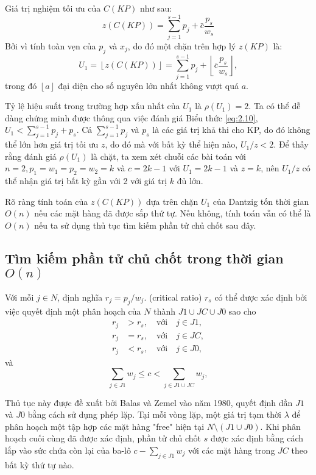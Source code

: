 Giá trị nghiệm tối ưu của $C(KP)$ như sau:
\begin{equation}
    z(C(KP)) = \sum_{j=1}^{s - 1}p_j + \bar{c}\frac{p_s}{w_s}
\end{equation}
Bởi vì tính toàn vẹn của $p_j$ và $x_j$, do đó một chặn trên hợp lý $z(KP)$ là:
\begin{equation}
    \label{eq:2.10}
    U_1 = \left \lfloor z(C(KP))\right \rfloor = \sum_{j = 1}^{s - 1}p_j + \left \lfloor \bar{c}\frac{p_s}{w_s}\right \rfloor,
\end{equation}
trong đó $\left \lfloor a\right \rfloor$ đại diện cho số nguyên lớn nhất không vượt quá $a$.

Tỷ lệ hiệu suất trong trường hợp xấu nhất của $U_1$ là $\rho(U_1) = 2$. Ta có thể dễ dàng chứng minh được thông qua việc đánh giá Biểu thức \eqref{eq:2.10}, $U_1 < \sum_{j = 1}^{s-1}p_j + p_s$. Cả $\sum_{j = 1}^{s-1}p_j$ và $p_s$ là các giá trị khả thi cho KP, do đó không thể lớn hơn giá trị tối ưu $z$, do đó mà với bất kỳ thể hiện nào, $U_1 / z < 2$. Để thấy rằng đánh giá $\rho(U_1)$ là chặt, ta xem xét chuỗi các bài toán với $n= 2, p_1 = w_1 = p_2 = w_2 = k$ và $c = 2k - 1$ với $U_1 = 2k - 1$ và $z = k$, nên $U_1 / z$ có thể nhận giá trị bất kỳ gần với 2 với giá trị $k$ đủ lớn.

Rõ ràng tính toán của $z(C(KP))$ dựa trên chặn $U_1$ của Dantzig tốn thời gian $O(n)$ nếu các mặt hàng đã được sắp thứ tự. Nếu không, tính toán vẫn có thể là $O(n)$ nếu ta sử dụng thủ tục tìm kiếm phần tử chủ chốt sau đây.

\subsection{Tìm kiếm phần tử chủ chốt trong thời gian $O(n)$}

Với mỗi $j \in N$, định nghĩa $r_j = p_j / w_j$.  (critical ratio) $r_s$ có thể được xác định bởi việc quyết định một phân hoạch của $N$ thành $J1 \cup JC \cup J0$ sao cho
\begin{align}
    r_j &> r_s, \quad \text{với} \quad j \in J1, \\
    r_j &=r_s, \quad \text{với} \quad j \in JC, \\
    r_j &< r_s, \quad \text{với} \quad j \in J0,
\end{align}
và
\begin{equation}
    \sum_{j \in J1}w_j \leq c < \sum_{j \in J1 \cup JC}w_j,
\end{equation}

Thủ tục này được đề xuất bởi Balas và Zemel vào năm 1980, quyết định dần $J1$ và $J0$ bằng cách sử dụng phép lặp. Tại mỗi vòng lặp, một giá trị tạm thời  $\lambda$ để phân hoạch một tập hợp các mặt hàng "free" hiện tại $N \setminus (J1 \cup J0)$. Khi phân hoạch cuối cùng đã được xác định, phần tử chủ chốt $s$ được xác định bằng cách lắp vào sức chứa còn lại của ba-lô $c - \sum_{j \in J1}w_j$ với các mặt hàng trong $JC$ theo bất kỳ thứ tự nào.


